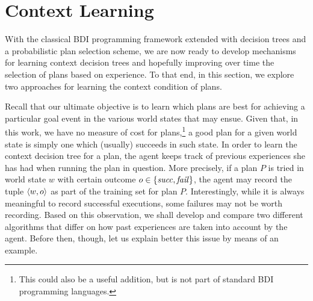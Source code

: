 \section{Context Learning}\label{sec:context_learning}

\newcommand{\success}{\mbox{\emph{succ}}}
\newcommand{\failure}{\mbox{\emph{fail}}}

With the classical BDI programming framework extended with decision trees and a
probabilistic plan selection scheme, we are now ready to develop mechanisms for
learning context decision trees and hopefully improving over time the selection
of plans based on experience.
To that end, in this section, we explore two approaches for learning the context
condition of plans.



Recall that our ultimate objective is to learn which plans are best for achieving
a particular goal event in the various world states that may ensue. Given that,
in this work, we have no measure of cost for plans,\footnote{This could also be a
useful addition, but is not part of standard BDI programming languages.} a good
plan for a given world state is simply one which (usually) succeeds in such
state. In order to learn the context decision tree for a plan, the agent keeps
track of previous experiences she has had when running the plan in question. More
precisely, if a plan $P$ is tried in world state $w$ with certain outcome $o \in
\{\success,\failure\}$, the agent may record the tuple $\langle w,o \rangle$ as part of
the training set for plan $P$.
Interestingly, while it is always meaningful to record successful executions,
some failures may not be worth recording. Based on this observation, we shall
develop and compare two different algorithms that differ on how past experiences
are taken into account by the agent. Before then, though, let us explain better
this issue by means of an example.
 

